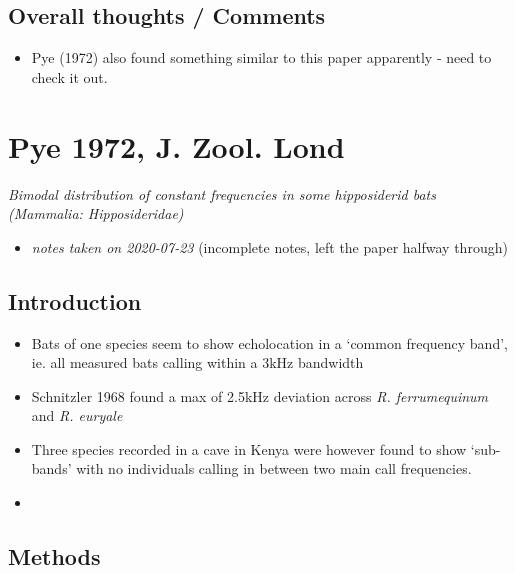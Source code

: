 \documentclass[
]{book}
\providecommand{\tightlist}{%
  \setlength{\itemsep}{0pt}\setlength{\parskip}{0pt}}
\begin{document}
\hypertarget{overall-thoughts-comments-1}{%
\section{Overall thoughts / Comments}\label{overall-thoughts-comments-1}}

\begin{itemize}
\tightlist
\item
  Pye (1972) also found something similar to this paper apparently - need to check it out.
\end{itemize}

\hypertarget{pye-1972-j.-zool.-lond}{%
\chapter{Pye 1972, J. Zool. Lond}\label{pye-1972-j.-zool.-lond}}


\emph{Bimodal distribution of constant frequencies in some hipposiderid bats (Mammalia: Hipposideridae)} \citep{pye1972bimodal}

\begin{itemize}
\tightlist
\item
  \emph{notes taken on 2020-07-23} (incomplete notes, left the paper halfway through)
\end{itemize}

\hypertarget{introduction-2}{%
\section{Introduction}\label{introduction-2}}

\begin{itemize}
\item
  Bats of one species seem to show echolocation in a `common frequency band', ie. all measured bats calling within a 3kHz bandwidth
\item
  Schnitzler 1968 found a max of 2.5kHz deviation across \emph{R. ferrumequinum} and \emph{R. euryale}
\item
  Three species recorded in a cave in Kenya were however found to show `sub-bands' with no individuals calling in between two main call frequencies.
\item
\end{itemize}

\hypertarget{methods-5}{%
\section{Methods}\label{methods-5}}
\end{document}
